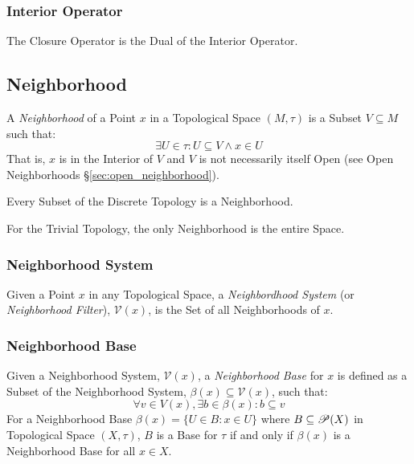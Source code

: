 \subsubsection{Interior Operator}\label{sec:interior_operator}

The Closure Operator is the Dual of the Interior Operator.



\subsection{Neighborhood}\label{sec:neighborhood}

A \emph{Neighborhood} of a Point $x$ in a Topological Space $(M,\tau)$
is a Subset $V \subseteq M$ such that:
\[
  \exists U \in \tau : U \subseteq V \wedge x \in U
\]
That is, $x$ is in the Interior of $V$ and $V$ is not necessarily
itself Open (see Open Neighborhoods \S\ref{sec:open_neighborhood}).

Every Subset of the Discrete Topology is a Neighborhood.

For the Trivial Topology, the only Neighborhood is the entire Space.



\subsubsection{Neighborhood System}\label{sec:neighborhood_system}

Given a Point $x$ in any Topological Space, a \emph{Neighbordhood
  System} (or \emph{Neighborhood Filter}), $\mathcal{V}(x)$, is the
Set of all Neighborhoods of $x$.



\subsubsection{Neighborhood Base}\label{sec:neighborhood_base}

Given a Neighborhood System, $\mathcal{V}(x)$, a \emph{Neighborhood
  Base} for $x$ is defined as a Subset of the Neighborhood System,
$\beta(x) \subseteq \mathcal{V}(x)$, such that:
\[
  \forall v \in V(x), \exists b \in \beta(x) : b \subseteq v
\]
For a Neighborhood Base $\beta(x) = \{ U \in B : x \in U \}$ where $B
\subseteq \mathscr{P}(X)$ in Topological Space $(X,\tau)$, $B$ is a
Base for $\tau$ if and only if $\beta(x)$ is a Neighborhood Base for
all $x \in X$.



